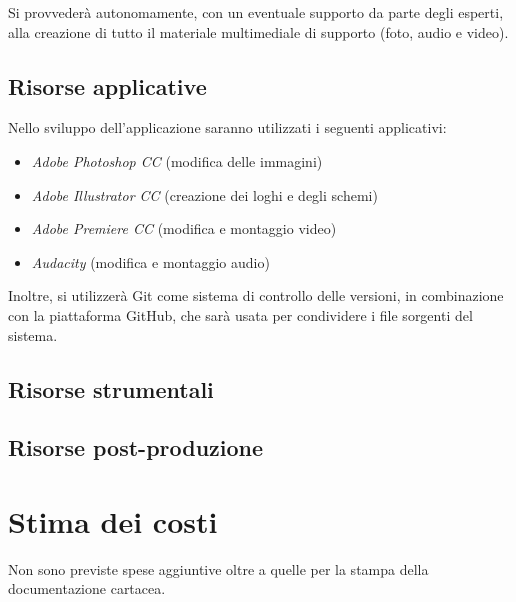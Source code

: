 Si provvederà autonomamente, con un eventuale supporto da parte degli esperti, alla creazione di tutto il materiale multimediale di supporto (foto, audio e video).

\subsection{Risorse applicative}
Nello sviluppo dell'applicazione saranno utilizzati i seguenti applicativi:
\begin{itemize}
	\item \emph{Adobe Photoshop CC} (modifica delle immagini)
	\item \emph{Adobe Illustrator CC} (creazione dei loghi e degli schemi)
	\item \emph{Adobe Premiere CC} (modifica e montaggio video)
	\item \emph{Audacity} (modifica e montaggio audio)
\end{itemize}
Inoltre, si utilizzerà Git come sistema di controllo delle versioni, in combinazione con la piattaforma GitHub, che sarà usata per condividere i file sorgenti del sistema.

\subsection{Risorse strumentali}

\subsection{Risorse post-produzione}

\section{Stima dei costi}
Non sono previste spese aggiuntive oltre a quelle per la stampa della documentazione cartacea.
